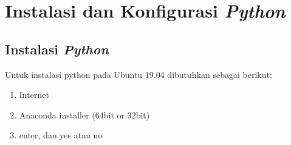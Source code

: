\chapter{Instalasi dan Konfigurasi \textbf{\textit{Python}}}

\section{Instalasi \textbf{\textit{Python}}}
Untuk instalasi python pada Ubuntu 19.04 dibutuhkan sebagai berikut:

\begin{enumerate}
\item Internet
\item Anaconda installer (64bit or 32bit)
\item enter, dan yes atau no
\end{enumerate}

